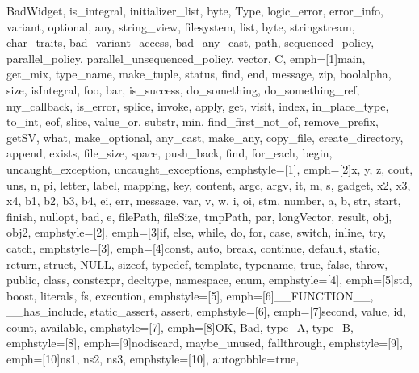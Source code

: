 {{              BadWidget, is_integral, initializer_list, byte, Type, logic_error,
              error_info, variant, optional, any, string_view, filesystem, list, byte,
              stringstream, char_traits, bad_variant_access, bad_any_cast, path,
              sequenced_policy, parallel_policy, parallel_unsequenced_policy, vector, C},
emph=[1]{main, get_mix, type_name, make_tuple, status, find, end, message, zip, boolalpha, size,
         isIntegral,  foo, bar, is_success, do_something, do_something_ref, my_callback, is_error,
         splice, invoke, apply, get, visit, index, in_place_type, to_int, eof, slice, value_or,
         substr, min, find_first_not_of, remove_prefix, getSV, what, make_optional, any_cast, make_any,
         copy_file, create_directory, append, exists, file_size, space, push_back, find,
         for_each, begin, uncaught_exception, uncaught_exceptions},
emphstyle=[1]{\color{NavyBlue}}, %
emph=[2]{x, y, z, cout, uns, n, pi, letter, label, mapping, key, content, argc, argv, it, m, s,
         gadget, x2, x3, x4, b1, b2, b3, b4, ei, err, message, var, v, w, i, oi, stm, number, a, b,
         str, start, finish, nullopt, bad, e, filePath, fileSize, tmpPath, par, longVector, result,
         obj, obj2},
emphstyle=[2]{\color{Orange}}, %
emph=[3]{if, else, while, do, for, case, switch, inline, try, catch},
emphstyle=[3]{\color{violet}}, %
emph=[4]{const, auto, break, continue, default, static, return, struct, NULL, sizeof, typedef,
         template, typename, true, false, throw, public, class, constexpr, decltype, namespace, enum},
emphstyle=[4]{\color{ProcessBlue}}, %
emph=[5]{std, boost, literals, fs, execution},
emphstyle=[5]{\color{Maroon}}, %
emph=[6]{__FUNCTION__, __has_include, static_assert, assert},
emphstyle=[6]{\color{Gray}}, %
emph=[7]{second, value, id, count, available},
emphstyle=[7]{\color{Peach!50!Purple}}, %
emph=[8]{OK, Bad, type_A, type_B},
emphstyle=[8]{\color{Blue}}, %
emph=[9]{nodiscard, maybe_unused, fallthrough},
emphstyle=[9]{\color{Goldenrod!50!black}}, %
emph=[10]{ns1, ns2, ns3},
emphstyle=[10]{\color{MediumSeaGreen}}, %
autogobble=true, %
}


